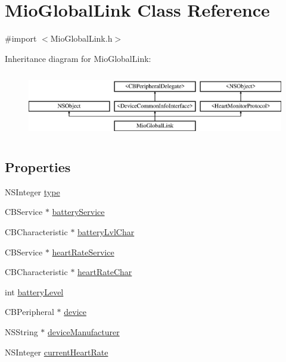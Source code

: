 \hypertarget{interface_mio_global_link}{\section{Mio\-Global\-Link Class Reference}
\label{interface_mio_global_link}
}


{\ttfamily \#import $<$Mio\-Global\-Link.\-h$>$}

Inheritance diagram for Mio\-Global\-Link\-:\begin{figure}[H]
\begin{center}
\leavevmode
\includegraphics[height=2.901554cm]{interface_mio_global_link}
\end{center}
\end{figure}
\subsection*{Properties}
\begin{DoxyCompactItemize}
\item 
N\-S\-Integer \hyperlink{interface_mio_global_link_a82edb3dd6e24af3fb2ed9061e2c2b21f}{type}
\item 
C\-B\-Service $\ast$ \hyperlink{interface_mio_global_link_a6615e890d11dfb95046f5f229f789f8e}{battery\-Service}
\item 
C\-B\-Characteristic $\ast$ \hyperlink{interface_mio_global_link_a77ed04d9593004c08ec49e1620cd79a0}{battery\-Lvl\-Char}
\item 
C\-B\-Service $\ast$ \hyperlink{interface_mio_global_link_af59bfad40ad67f8cc419f3242f04500b}{heart\-Rate\-Service}
\item 
C\-B\-Characteristic $\ast$ \hyperlink{interface_mio_global_link_a6d0625aca6d7b1638753cb5e321e9632}{heart\-Rate\-Char}
\item 
int \hyperlink{interface_mio_global_link_a7f0add9d273f0d51eb4b3c73f3eb167d}{battery\-Level}
\item 
C\-B\-Peripheral $\ast$ \hyperlink{interface_mio_global_link_a8d4650fecd6a5f86366446e862be7f21}{device}
\item 
N\-S\-String $\ast$ \hyperlink{interface_mio_global_link_a5d67ddaf6d5941b85f93196a95630b9d}{device\-Manufacturer}
\item 
N\-S\-Integer \hyperlink{interface_mio_global_link_acb64fafbafbb75c3e6f2c382841f9f06}{current\-Heart\-Rate}
\end{DoxyCompactItemize}
